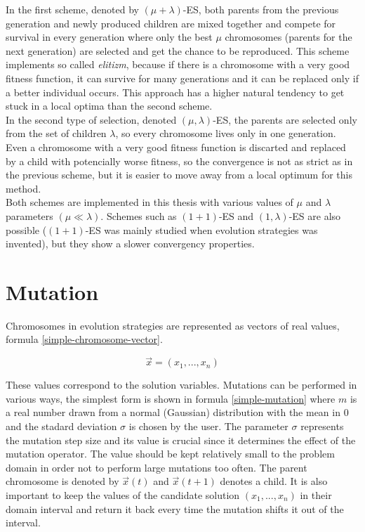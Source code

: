 In the first scheme, denoted by $(\mu + \lambda)$-ES, both parents from the previous generation and newly produced children are mixed together and compete for survival in every generation where only the best $\mu$ chromosomes (parents for the next generation) are selected and get the chance to be reproduced. This scheme implements so called \textit{elitizm}, because if there is a chromosome with a very good fitness function, it can survive for many generations and it can be replaced only if a better individual occurs. This approach has a higher natural tendency to get stuck in a local optima than the second scheme.\\
In the second type of selection, denoted $(\mu,\lambda)$-ES, the parents are selected only from the set of children $\lambda$, so every chromosome lives only in one generation. Even a chromosome with a very good fitness function is discarted and replaced by a child with potencially worse fitness, so the convergence is not as strict as in the previous scheme, but it is easier to move away from a local optimum for this method.\\
Both schemes are implemented in this thesis with various values of $\mu$ and $\lambda$ parameters $(\mu \ll \lambda)$. Schemes such as $(1 + 1)$-ES and $(1, \lambda)$-ES are also possible ($(1 + 1)$-ES was mainly studied when evolution strategies was invented), but they show a slower convergency properties.

\section{Mutation}
Chromosomes in evolution strategies are represented as vectors of real values, formula \ref{simple-chromosome-vector}.

\begin{equation} \label{simple-chromosome-vector}
\vec{x} = (x_1,...,x_n)
 \end{equation}

 These values correspond to the solution variables. Mutations can be performed in various ways, the simplest form is shown in formula \ref{simple-mutation} where $m$ is a real number drawn from a normal (Gaussian) distribution with the mean in $0$ and the stadard deviation $\sigma$ is chosen by the user. The parameter $\sigma$ represents the mutation step size and its value is crucial since it determines the effect of the mutation operator. The value should be kept relatively small to the problem domain in order not to perform large mutations too often. The parent chromosome is denoted by $\vec{x}(t)$ and $\vec{x}(t+1)$ denotes a child. It is also important to keep the values of the candidate solution $(x_1,...,x_n)$ in their domain interval and return it back every time the mutation shifts it out of the interval.

